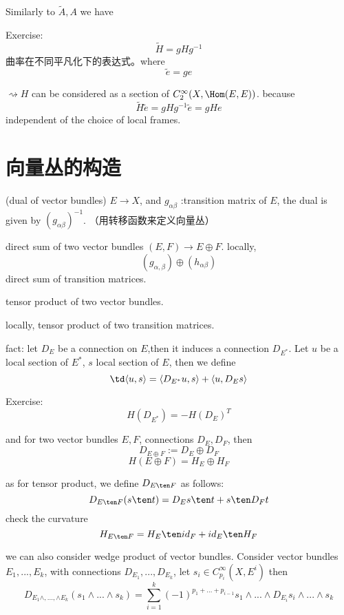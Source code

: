 Similarly to $\tilde{A},A$ we have

Exercise:
$$\tilde{H}=gHg^{-1}$$
曲率在不同平凡化下的表达式。where
$$\tilde{e}=ge$$

$\rightsquigarrow H$ can be considered as a section of $C^\infty_2(X,\Hom(E,E))$.
because
$$\tilde{H}\tilde{e}=gHg^{-1}\tilde{e}=gHe$$
independent of the choice of local frames.

\section{向量丛的构造}
\begin{definition}(dual of vector bundles)
$E\to X$, and $g_{\alpha\beta}$ :transition matrix of $E$,
the dual is given by
$(g_{\alpha\beta})^{-1}$.
（用转移函数来定义向量丛）
\end{definition}

\begin{definition}
direct sum of two vector bundles $(E,F)\to E\oplus F$.
locally,
$$(g_{\alpha,\beta})\oplus(h_{\alpha\beta})$$
direct sum of transition matrices.
\end{definition}

\begin{definition}
tensor product of two vector bundles.

locally, tensor product of two transition matrices.
\end{definition}

fact: let $D_E$ be a connection on $E$,then it induces a connection $D_{E^*}$.
Let $u$ be a local section of $E^*$, $s$ local section of $E$,
then we define
$$\td\langle u,s\rangle=\langle D_{E^*}u,s\rangle+\langle u,D_{E}s\rangle$$

Exercise:
$$H(D_{E^*})=-H(D_E)^T$$

and for two vector bundles $E,F$, connections $D_E,D_F$, then
$$D_{E\oplus F}:=D_E\oplus D_F$$
$$H(E\oplus F)=H_E\oplus H_F$$

as for tensor product,
we define $D_{E\ten F}$ as follows:
$$D_{E\ten F}(s\ten t)=D_Es\ten t+s\ten D_Ft$$
check the curvature
$$H_{E\ten F}=H_E\ten id_F+id_E\ten H_F$$

\begin{rem}
we can also consider wedge product of vector bundles.
Consider vector bundles $E_1,...,E_k$,
with connections $D_{E_1},...,D_{E_k}$,
let $s_i\in C_{p_i}^\infty(X,E^i)$
then
$$D_{E_1\wedge,...,\wedge E_k}(s_1\wedge...\wedge s_k)
=\sum_{i=1}^k(-1)^{p_1+...+p_{i-1}}s_1
\wedge...\wedge D_{E_i}s_i\wedge...\wedge s_k$$
\end{rem}

